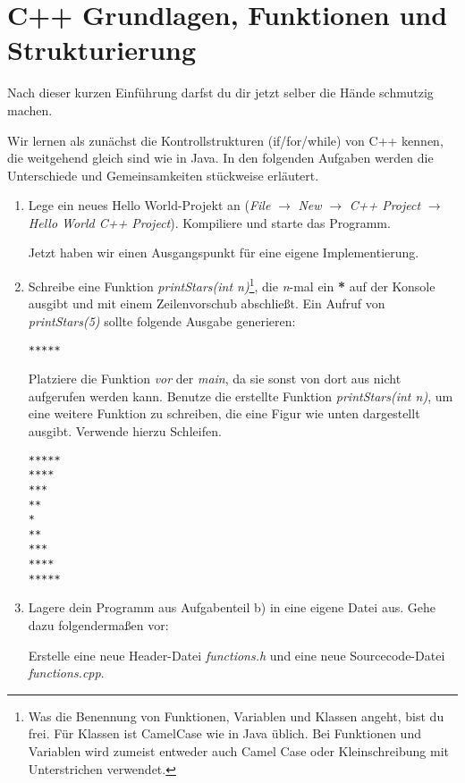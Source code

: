 \section{C++ Grundlagen, Funktionen und Strukturierung}

Nach dieser kurzen Einführung darfst du dir jetzt selber die Hände schmutzig machen.

Wir lernen als zunächst die Kontrollstrukturen (if/for/while) von C++ kennen, die weitgehend gleich sind wie in Java.
In den folgenden Aufgaben werden die Unterschiede und Gemeinsamkeiten stückweise erläutert.

\begin{enumerate}

\item Lege ein neues \glqq{}Hello World\grqq{}-Projekt an (\emph{File} $\rightarrow$ \emph{New} $\rightarrow$ \emph{C++ Project} $\rightarrow$ \emph{Hello World C++ Project}).
Kompiliere und starte das Programm.

Jetzt haben wir einen Ausgangspunkt für eine eigene Implementierung.


\item 
Schreibe eine Funktion \emph{printStars(int n)}\footnote{Was die Benennung von Funktionen, Variablen und Klassen angeht, bist du frei.
Für Klassen ist CamelCase wie in Java üblich. Bei Funktionen und Variablen wird zumeist entweder auch Camel Case oder Kleinschreibung mit Unterstrichen verwendet.}, die \emph{n}-mal ein \textbf{*} auf der Konsole ausgibt und mit einem Zeilenvorschub abschließt.
Ein Aufruf von \emph{printStars(5)} sollte folgende Ausgabe generieren:
\begin{lstlisting}
*****
\end{lstlisting}

Platziere die Funktion \emph{vor} der \emph{main}, da sie sonst von dort aus nicht aufgerufen werden kann.
Benutze die erstellte Funktion \emph{printStars(int n)}, um eine weitere Funktion zu schreiben, die eine Figur wie unten dargestellt ausgibt.
Verwende hierzu Schleifen.
\begin{lstlisting}
*****
****
***
**
*
**
***
****
*****
\end{lstlisting}

\item
Lagere dein Programm aus Aufgabenteil b) in eine eigene Datei aus.
Gehe dazu folgendermaßen vor: 

Erstelle eine neue Header-Datei \emph{functions.h} und eine neue Sourcecode-Datei \emph{functions.cpp}. 


\end{enumerate}
